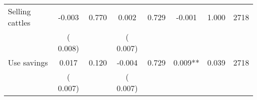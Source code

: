 \begin{tabular}{l*{7}{c}}
 Selling cattles       &             -0.003       &        0.770  &              0.002       &        0.729  &             -0.001       &              1.000 &  2718 \\ 
                       &       (       0.008)             &                               &       (       0.007)                     &                               &                                               &                                &                      \\ 

 Use savings       &              0.017       &        0.120  &             -0.004       &        0.729  &              0.009**       &              0.039 &  2718 \\ 
                       &       (       0.007)             &                               &       (       0.007)                     &                               &                                               &                                &                      \\ 

\hline \end{tabular}